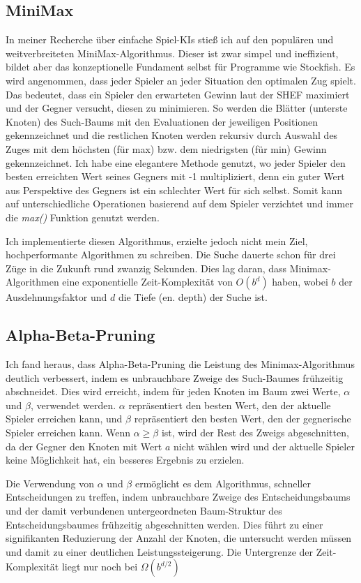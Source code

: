 \documentclass{jpp}
\begin{document}
\subsection{MiniMax}
In meiner Recherche über einfache Spiel-KIs stieß ich auf den populären und weitverbreiteten MiniMax-Algorithmus. Dieser ist zwar simpel und ineffizient, bildet aber das konzeptionelle Fundament selbst für Programme wie Stockfish.
Es wird angenommen, dass jeder Spieler an jeder Situation den optimalen Zug spielt. Das bedeutet, dass ein Spieler den erwarteten Gewinn laut der SHEF maximiert und der Gegner versucht, diesen zu minimieren. So werden die Blätter (unterste Knoten) des Such-Baums mit den Evaluationen der jeweiligen Positionen gekennzeichnet und die restlichen Knoten werden rekursiv durch Auswahl des Zuges mit dem höchsten (für max) bzw. dem niedrigsten (für min) Gewinn gekennzeichnet. Ich habe eine elegantere Methode genutzt, wo jeder Spieler den besten erreichten Wert seines Gegners mit -1 multipliziert, denn ein guter Wert aus Perspektive des Gegners ist ein schlechter Wert für sich selbst. Somit kann auf unterschiedliche Operationen basierend auf dem Spieler verzichtet und immer die \textit{max()} Funktion genutzt werden.

Ich implementierte diesen Algorithmus, erzielte jedoch nicht mein Ziel, hochperformante Algorithmen zu schreiben. Die Suche dauerte schon für drei Züge in die Zukunft rund zwanzig Sekunden. Dies lag daran, dass Minimax-Algorithmen eine exponentielle Zeit-Komplexität von $O(b^d)$ haben, wobei $b$ der Ausdehnungsfaktor und $d$ die Tiefe (en. depth) der Suche ist.

\subsection{Alpha-Beta-Pruning}
Ich fand heraus, dass Alpha-Beta-Pruning die Leistung des Minimax-Algorithmus deutlich verbessert, indem es unbrauchbare Zweige des Such-Baumes frühzeitig abschneidet. Dies wird erreicht, indem für jeden Knoten im Baum zwei Werte, $\alpha$ und $\beta$, verwendet werden. $\alpha$ repräsentiert den besten Wert, den der aktuelle Spieler erreichen kann, und $\beta$ repräsentiert den besten Wert, den der gegnerische Spieler erreichen kann. Wenn $\alpha \geq \beta$ ist, wird der Rest des Zweigs abgeschnitten, da der Gegner den Knoten mit Wert $a$ nicht wählen wird und der aktuelle Spieler keine Möglichkeit hat, ein besseres Ergebnis zu erzielen.

Die Verwendung von $\alpha$ und $\beta$ ermöglicht es dem Algorithmus, schneller Entscheidungen zu treffen, indem unbrauchbare Zweige des Entscheidungsbaums und der damit verbundenen untergeordneten Baum-Struktur des Entscheidungsbaumes frühzeitig abgeschnitten werden. Dies führt zu einer signifikanten Reduzierung der Anzahl der Knoten, die untersucht werden müssen und damit zu einer deutlichen Leistungssteigerung. Die Untergrenze der Zeit-Komplexität liegt nur noch bei $\Omega(b^{d/2})$
\end{document}
